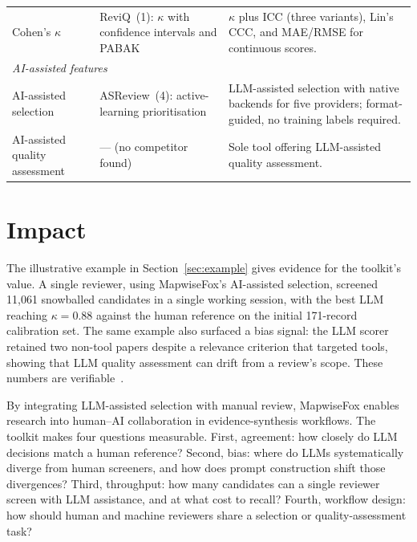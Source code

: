 \documentclass[preprint,12pt, a4paper]{elsarticle}
\begin{document}
\begin{table}[!ht]
\begin{tabular}{p{}p{}p{}}
    Cohen's $\kappa$ & ReviQ~(1): $\kappa$ with confidence intervals and
    PABAK & $\kappa$ plus ICC (three variants), Lin's CCC, and MAE/RMSE for
    continuous scores. \\
    \multicolumn{3}{l}{\textit{AI-assisted features}} \\
    AI-assisted selection & ASReview~(4): active-learning prioritisation &
    LLM-assisted selection with native backends for five providers;
    format-guided, no training labels required. \\
    AI-assisted quality assessment & --- (no competitor found) & Sole tool
    offering LLM-assisted quality assessment. \\
    \hline
  \end{tabular}
\end{table}


\section{Impact}

The illustrative example in Section~\ref{sec:example} gives
evidence for the toolkit's value. A single reviewer, using MapwiseFox's
AI-assisted selection, screened 11{,}061 snowballed candidates in a single
working session, with the best LLM reaching $\kappa = 0.88$ against the human
reference on the initial 171-record calibration set. The same example
also surfaced a bias signal: the LLM scorer retained two non-tool papers
despite a relevance criterion that targeted tools, showing that LLM
quality assessment can drift from a review's scope. These numbers are
verifiable~\cite{olar2026-config-examples}.

By integrating LLM-assisted selection with manual review, MapwiseFox
enables research into human--AI collaboration in evidence-synthesis
workflows. The toolkit makes four questions measurable. First,
agreement: how closely do LLM decisions match a human reference? Second,
bias: where do LLMs systematically diverge from human screeners, and how
does prompt construction shift those divergences? Third, throughput: how
many candidates can a single reviewer screen with LLM assistance, and at
what cost to recall? Fourth, workflow design: how should human and machine
reviewers share a selection or quality-assessment task?
\end{document}
